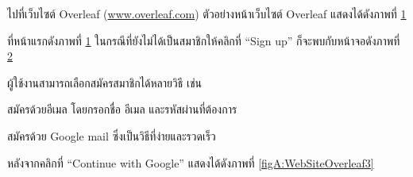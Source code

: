 \begin{mycustomenum2}
    \item ไปที่เว็บไซต์ Overleaf (\href{http://www.overleaf.com}{www.overleaf.com}) ตัวอย่างหน้าเว็บไซต์ Overleaf แสดงได้ดังภาพที่ \ref{figA:WebSiteOverleaf1}

\begin{figure}[htbp]
\centering
{}
\caption{}
\label{figA:WebSiteOverleaf1}
\end{figure}

    \item ที่หน้าแรกดังภาพที่ \ref{figA:WebSiteOverleaf1} ในกรณีที่ยังไม่ได้เป็นสมาชิกให้คลิกที่ \enquote{Sign up} ก็จะพบกับหน้าจอดังภาพที่ \ref{figA:WebSiteOverleaf2}

\begin{figure}[htbp]
\centering
{}
\caption{}
\label{figA:WebSiteOverleaf2}
\end{figure}

    \item ผู้ใช้งานสามารถเลือกสมัครสมาชิกได้หลายวิธี เช่น
    \begin{mycustomenum2}
        \item สมัครด้วยอีเมล โดยกรอกชื่อ อีเมล และรหัสผ่านที่ต้องการ
        \item สมัครด้วย Google mail ซึ่งเป็นวิธีที่ง่ายและรวดเร็ว 
        \begin{mycustomenum2}
            \item หลังจากคลิกที่ \enquote{Continue with Google} แสดงได้ดังภาพที่ \ref{figA:WebSiteOverleaf3}


\end{mycustomenum2}
\end{mycustomenum2}
\end{mycustomenum2}
